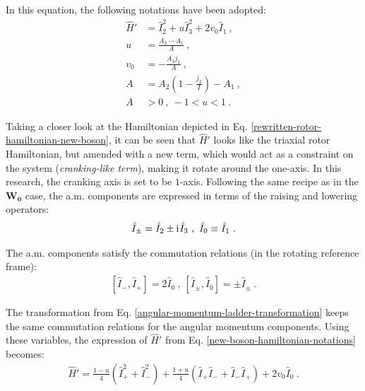 In this equation, the following notations have been adopted:
\begin{align}
    \hat{H}'&=\hat{I}_2^2+u\hat{I}_3^2+2v_0\hat{I}_1\ ,\nonumber\\
    u&=\frac{A_3-A_1}{A}\ ,\nonumber\\
    v_0&=-\frac{A_1j_1}{A}\ ,\nonumber\\
    A&=A_2\left(1-\frac{j_2}{I}\right)-A_1\ ,\nonumber\\
    A&>0\ ,\ -1<u<1\ .
    \label{new-boson-hamiltonian-notations}
\end{align}

Taking a closer look at the Hamiltonian depicted in Eq. \ref{rewritten-rotor-hamiltonian-new-boson}, it can be seen that $\hat{H}'$ looks like the triaxial rotor Hamiltonian, but amended with a new term, which would act as a constraint on the system (\emph{cranking-like term}), making it rotate around the one-axis. In this research, the cranking axis is set to be $1$-axis. Following the same recipe as in the $\mathbf{W_0}$ case, the a.m. components are expressed in terms of the raising and lowering operators:
\begin{align}
    \hat{I}_\pm=\hat{I}_2\pm\mathrm{i}\mkern1mu\hat{I}_3\ ,\ \hat{I}_0\equiv\hat{I}_1\ .
\end{align}

The a.m. components satisfy the commutation relations (in the rotating reference frame):
\begin{align}
    \left[\hat{I}_-,\hat{I}_+\right]=2\hat{I}_0\ ,\ \left[\hat{I}_\pm,\hat{I}_0\right]=\pm\hat{I}_\pm\ .
    \label{angular-momentum-ladder-transformation}
\end{align}

The transformation from Eq. \ref{angular-momentum-ladder-transformation} keeps the same commutation relations for the angular momentum components. Using these variables, the expression of $\hat{H}'$ from Eq. \ref{new-boson-hamiltonian-notations} becomes:
\begin{align}
    \hat{H}'=\frac{1-u}{4}\left(\hat{I}_+^2+\hat{I}_-^2\right)+\frac{1+u}{4}\left(\hat{I}_+\hat{I}_-+\hat{I}_-\hat{I}_+\right)+2v_0\hat{I}_0\ .
    \label{hamiltonian-new-boson-ladder-operators}
\end{align}

